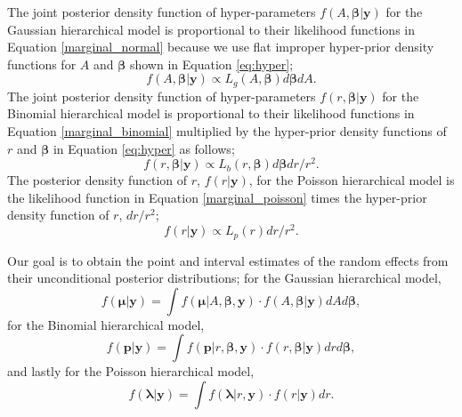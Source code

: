 \documentclass[article]{jss}
\begin{document}

The joint posterior density  function of hyper-parameters $f(A, \boldsymbol{\boldsymbol{\beta}}\vert \boldsymbol{y})$ for the Gaussian hierarchical model is proportional to their likelihood functions in Equation \ref{marginal_normal} because we use flat improper hyper-prior density functions for $A$ and $\boldsymbol{\beta}$ shown in Equation \ref{eq:hyper};
\begin{equation}\label{marginal_post_normal}
f(A, \boldsymbol{\boldsymbol{\beta}}\vert \boldsymbol{y})\propto L_g(A, \boldsymbol{\boldsymbol{\beta}})d\boldsymbol{\beta}dA.
\end{equation}
The joint posterior density  function of hyper-parameters $f(r, \boldsymbol{\boldsymbol{\beta}}\vert \boldsymbol{y})$ for the Binomial hierarchical model is proportional to their likelihood functions in Equation \ref{marginal_binomial} multiplied by the hyper-prior density functions of $r$ and $\boldsymbol{\beta}$ in Equation \ref{eq:hyper} as follows;
\begin{equation}\label{marginal_post_binomial}
f(r, \boldsymbol{\boldsymbol{\beta}}\vert \boldsymbol{y})\propto L_b(r, \boldsymbol{\boldsymbol{\beta}})d\boldsymbol{\beta}dr/r^2.
\end{equation}
The posterior density function of $r$, $f(r\vert \boldsymbol{y})$, for the Poisson hierarchical model is  the likelihood function in Equation \ref{marginal_poisson} times the hyper-prior density function of $r$, $dr/r^2$;
\begin{equation}\label{marginal_post_poisson}
f(r \vert \boldsymbol{y})\propto L_p(r)dr/r^2.
\end{equation}

Our goal is to obtain the point and interval estimates of the random effects from their unconditional posterior distributions; for the Gaussian hierarchical model, 
\begin{equation}\label{mcintegration_normal}
f(\boldsymbol{\mu}\vert \boldsymbol{y})=\int  f(\boldsymbol{\mu}\vert A, \boldsymbol{\beta}, \boldsymbol{y})\cdot f(A, \boldsymbol{\beta}\vert \boldsymbol{y})dA d\boldsymbol{\beta},
\end{equation}
for the Binomial hierarchical model, 
\begin{equation}\label{mcintegration_binomial}
f(\boldsymbol{p}\vert \boldsymbol{y})=\int  f(\boldsymbol{p}\vert r, \boldsymbol{\beta}, \boldsymbol{y})\cdot f(r, \boldsymbol{\beta}\vert \boldsymbol{y})dr d\boldsymbol{\beta},
\end{equation}
and lastly for the Poisson hierarchical model, 
\begin{equation}\label{mcintegration_poisson}
f(\boldsymbol{\lambda}\vert \boldsymbol{y})=\int  f(\boldsymbol{\lambda}\vert r, \boldsymbol{y})\cdot f(r\vert \boldsymbol{y})dr.
\end{equation}
\end{document}

